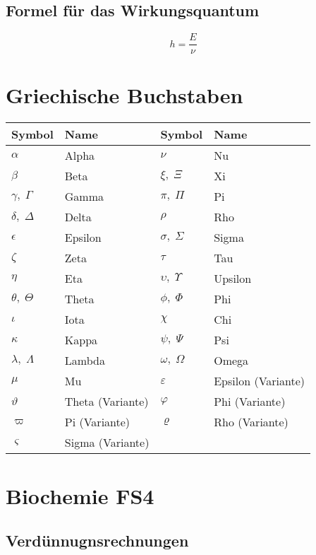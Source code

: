 \documentclass{article}
\begin{document}
\subsection{Formel für das Wirkungsquantum}
\begin{equation}
    h = \frac{E}{\nu}
\end{equation}


\section{Griechische Buchstaben}

\begin{center}
\begin{tabular}{ll|ll}
    \textbf{Symbol} & \textbf{Name} & \textbf{Symbol} & \textbf{Name} \\
    \hline
    $\alpha$ & Alpha & $\nu$ & Nu \\
    $\beta$ & Beta & $\xi,\;\Xi$ & Xi \\
    $\gamma,\;\Gamma$ & Gamma & $\pi,\;\Pi$ & Pi \\
    $\delta,\;\Delta$ & Delta & $\rho$ & Rho \\
    $\epsilon$ & Epsilon & $\sigma,\;\Sigma$ & Sigma \\
    $\zeta$ & Zeta & $\tau$ & Tau \\
    $\eta$ & Eta & $\upsilon,\;\Upsilon$ & Upsilon \\
    $\theta,\;\Theta$ & Theta & $\phi,\;\Phi$ & Phi \\
    $\iota$ & Iota & $\chi$ & Chi \\
    $\kappa$ & Kappa & $\psi,\;\Psi$ & Psi \\
    $\lambda,\;\Lambda$ & Lambda & $\omega,\;\Omega$ & Omega \\
    $\mu$ & Mu & $\varepsilon$ & Epsilon (Variante) \\
    $\vartheta$ & Theta (Variante) & $\varphi$ & Phi (Variante) \\
    $\varpi$ & Pi (Variante) & $\varrho$ & Rho (Variante) \\
    $\varsigma$ & Sigma (Variante) & & \\
\end{tabular}
\end{center}

\section{Biochemie FS4}

\subsection{Verdünnugnsrechnungen}
\end{document}
